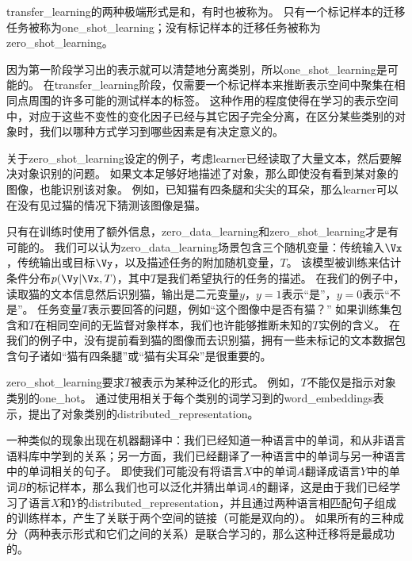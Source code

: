 \gls{transfer_learning}的两种极端形式是和，有时也被称为。
只有一个标记样本的迁移任务被称为\gls{one_shot_learning}；没有标记样本的迁移任务被称为\gls{zero_shot_learning}。


因为第一阶段学习出的表示就可以清楚地分离类别，所以\gls{one_shot_learning}\citep{Fei-Fei+al-2006}是可能的。
在\gls{transfer_learning}阶段，仅需要一个标记样本来推断表示空间中聚集在相同点周围的许多可能的测试样本的标签。
这种作用的程度使得在学习的表示空间中，对应于这些不变性的变化因子已经与其它因子完全分离，在区分某些类别的对象时，我们以哪种方式学习到哪些因素是有决定意义的。


关于\gls{zero_shot_learning}设定的例子，考虑\gls{learner}已经读取了大量文本，然后要解决对象识别的问题。
如果文本足够好地描述了对象，那么即使没有看到某对象的图像，也能识别该对象。
例如，已知猫有四条腿和尖尖的耳朵，那么\gls{learner}可以在没有见过猫的情况下猜测该图像是猫。


只有在训练时使用了额外信息，\gls{zero_data_learning}\citep{Larochelle2008}和\gls{zero_shot_learning}\citep{Palatucci2009,Socher-2013}才是有可能的。
我们可以认为\gls{zero_data_learning}场景包含三个随机变量：传统输入$\Vx$，传统输出或目标$\Vy$，以及描述任务的附加随机变量，$T$。
该模型被训练来估计条件分布$p(\Vy | \Vx, T)$，其中$T$是我们希望执行的任务的描述。
在我们的例子中，读取猫的文本信息然后识别猫，输出是二元变量$y$，$y=1$表示“是”，$y=0$表示“不是”。
任务变量$T$表示要回答的问题，例如“这个图像中是否有猫？”
如果训练集包含和$T$在相同空间的无监督对象样本，我们也许能够推断未知的$T$实例的含义。
在我们的例子中，没有提前看到猫的图像而去识别猫，拥有一些未标记的文本数据包含句子诸如“猫有四条腿”或“猫有尖耳朵”是很重要的。


\gls{zero_shot_learning}要求$T$被表示为某种泛化的形式。
例如，$T$不能仅是指示对象类别的\gls{one_hot}。
通过使用相关于每个类别的词学习到的\gls{word_embeddings}表示，\cite{Socher-2013}提出了对象类别的\gls{distributed_representation}。


一种类似的现象出现在机器翻译中\citep{Klementiev-et-al-COLING2012,Mikolov-et-al-arxiv2013,Gouws-et-al-arxiv2014}：我们已经知道一种语言中的单词，和从非语言语料库中学到的关系；另一方面，我们已经翻译了一种语言中的单词与另一种语言中的单词相关的句子。
即使我们可能没有将语言$X$中的单词$A$翻译成语言$Y$中的单词$B$的标记样本，那么我们也可以泛化并猜出单词$A$的翻译，这是由于我们已经学习了语言$X$和$Y$的\gls{distributed_representation}，并且通过两种语言相匹配句子组成的训练样本，产生了关联于两个空间的链接（可能是双向的）。
如果所有的三种成分（两种表示形式和它们之间的关系）是联合学习的，那么这种迁移将是最成功的。


